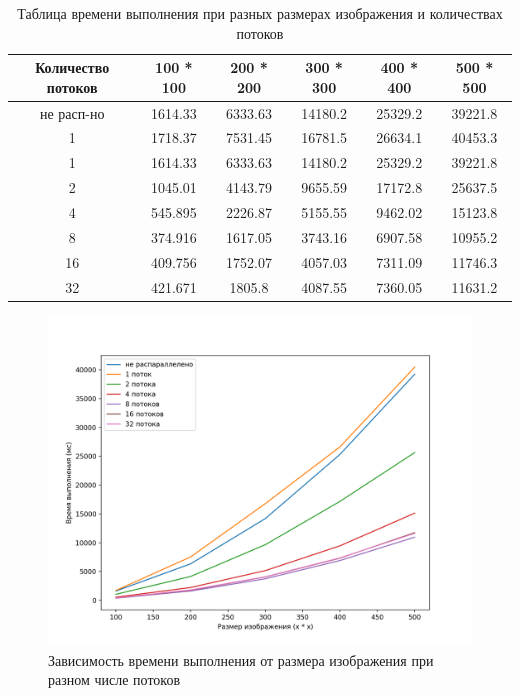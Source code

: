\documentclass[12pt]{report}
\begin{document}
\begin{table} [h!]
    \label{tableComp}
	\caption{Таблица времени выполнения при разных размерах изображения и количествах потоков}
	\begin{center}
		\begin{tabular}{|c c c c c c|} 
			\hline
			Количество потоков &  100 * 100 & 200 * 200 & 300 * 300 & 400 * 400 & 500 * 500 \\  
			\hline
			не расп-но & 1614.33 & 6333.63 & 14180.2 & 25329.2 & 39221.8\\
			\hline
			1 & 1718.37 & 7531.45 & 16781.5 & 26634.1 & 40453.3 \\
            \hline
            1 & 1614.33 & 6333.63 & 14180.2 & 25329.2 & 39221.8\\
            \hline
            2 & 1045.01 & 4143.79 & 9655.59 & 17172.8 & 25637.5\\
            \hline
            4 & 545.895 & 2226.87 & 5155.55 & 9462.02 & 15123.8\\
            \hline
            8 & 374.916 & 1617.05 & 3743.16 & 6907.58 & 10955.2\\
            \hline
            16 & 409.756 & 1752.07 & 4057.03 & 7311.09 & 11746.3\\
            \hline
            32 & 421.671 & 1805.8 & 4087.55 & 7360.05 & 11631.2\\
			\hline
		\end{tabular}
	\end{center}
\end{table}
\newpage
\begin{figure}[h!p]
	\centering
	\includegraphics[scale = 0.7]{comp.png}
	\caption{Зависимость времени выполнения от размера изображения при разном числе потоков}
	\label{imageComp}
\end{figure}
\end{document}
